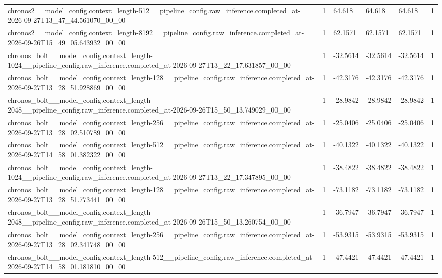 \begin{tabular}{llllll}
chronos2\_\_model\_config.context\_length-512\_\_pipeline\_config.raw\_inference.completed\_at-2026-09-27T13\_47\_44.561070\_00\_00 & 1 & 64.618 & 64.618 & 64.618 & 1 \\
chronos2\_\_model\_config.context\_length-8192\_\_pipeline\_config.raw\_inference.completed\_at-2026-09-26T15\_49\_05.643932\_00\_00 & 1 & 62.1571 & 62.1571 & 62.1571 & 1 \\
chronos\_bolt\_\_model\_config.context\_length-1024\_\_pipeline\_config.raw\_inference.completed\_at-2026-09-27T13\_22\_17.631857\_00\_00 & 1 & -32.5614 & -32.5614 & -32.5614 & 1 \\
chronos\_bolt\_\_model\_config.context\_length-128\_\_pipeline\_config.raw\_inference.completed\_at-2026-09-27T13\_28\_51.928869\_00\_00 & 1 & -42.3176 & -42.3176 & -42.3176 & 1 \\
chronos\_bolt\_\_model\_config.context\_length-2048\_\_pipeline\_config.raw\_inference.completed\_at-2026-09-26T15\_50\_13.749029\_00\_00 & 1 & -28.9842 & -28.9842 & -28.9842 & 1 \\
chronos\_bolt\_\_model\_config.context\_length-256\_\_pipeline\_config.raw\_inference.completed\_at-2026-09-27T13\_28\_02.510789\_00\_00 & 1 & -25.0406 & -25.0406 & -25.0406 & 1 \\
chronos\_bolt\_\_model\_config.context\_length-512\_\_pipeline\_config.raw\_inference.completed\_at-2026-09-27T14\_58\_01.382322\_00\_00 & 1 & -40.1322 & -40.1322 & -40.1322 & 1 \\
chronos\_bolt\_\_model\_config.context\_length-1024\_\_pipeline\_config.raw\_inference.completed\_at-2026-09-27T13\_22\_17.347895\_00\_00 & 1 & -38.4822 & -38.4822 & -38.4822 & 1 \\
chronos\_bolt\_\_model\_config.context\_length-128\_\_pipeline\_config.raw\_inference.completed\_at-2026-09-27T13\_28\_51.773441\_00\_00 & 1 & -73.1182 & -73.1182 & -73.1182 & 1 \\
chronos\_bolt\_\_model\_config.context\_length-2048\_\_pipeline\_config.raw\_inference.completed\_at-2026-09-26T15\_50\_13.260754\_00\_00 & 1 & -36.7947 & -36.7947 & -36.7947 & 1 \\
chronos\_bolt\_\_model\_config.context\_length-256\_\_pipeline\_config.raw\_inference.completed\_at-2026-09-27T13\_28\_02.341748\_00\_00 & 1 & -53.9315 & -53.9315 & -53.9315 & 1 \\
chronos\_bolt\_\_model\_config.context\_length-512\_\_pipeline\_config.raw\_inference.completed\_at-2026-09-27T14\_58\_01.181810\_00\_00 & 1 & -47.4421 & -47.4421 & -47.4421 & 1 \\

\end{tabular}
